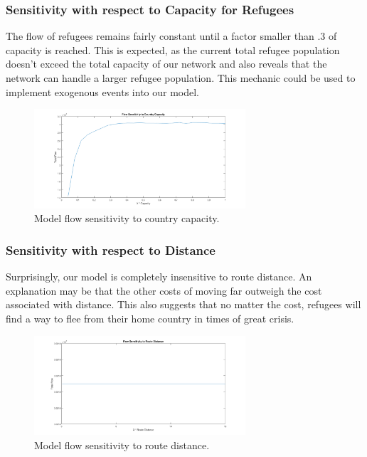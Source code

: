 \documentclass{article}
\begin{document}
\subsubsection{Sensitivity with respect to Capacity for Refugees}

The flow of refugees remains fairly constant until a factor smaller than .3 of capacity is reached. This is expected, as the current total refugee population doesn't exceed the total capacity of our network and also reveals that the network can handle a larger refugee population. This mechanic could be used to implement exogenous events into our model. 

\begin{figure}[H]
    \centering
    \includegraphics[width=0.7\textwidth]{Sensitivity3/scap.png}
    \caption [width=0.5\textwidth]{\centering Model flow sensitivity to country capacity.}
\end{figure}

\subsubsection{Sensitivity with respect to Distance}

Surprisingly, our model is completely insensitive to route distance. An explanation may be that the other costs of moving far outweigh the cost associated with distance. This also suggests that no matter the cost, refugees will find a way to flee from their home country in times of great crisis.

\begin{figure}[H]
    \centering
    \includegraphics[width=0.7\textwidth]{Sensitivity3/sdist.png}
    \caption [width=0.5\textwidth]{\centering Model flow sensitivity to route distance.}
\end{figure}
\end{document}

